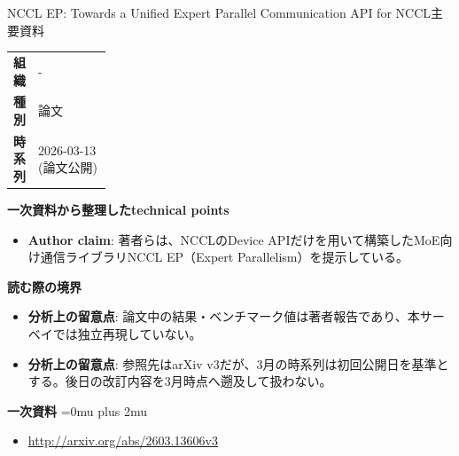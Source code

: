 \begin{technicalnote}{NCCL EP: Towards a Unified Expert Parallel Communication API for NCCL}{主要資料}
\begingroup
\begin{tabularx}{\linewidth}{@{}>{\bfseries}p{0.22\linewidth}X@{}}
組織 & - \\
種別 & 論文 \\
時系列 & 2026-03-13 (論文公開) \\
\end{tabularx}
\smallskip
{\bfseries 一次資料から整理したtechnical points}
\begin{itemize}[leftmargin=1.5em,itemsep=0.35em]
\item \textbf{Author claim}: 著者らは、NCCLのDevice APIだけを用いて構築したMoE向け通信ライブラリNCCL EP（Expert Parallelism）を提示している。
\end{itemize}
\begin{minipage}{\linewidth}
{\bfseries 読む際の境界}
\begin{itemize}[leftmargin=1.5em,itemsep=0.35em]
\item \textbf{分析上の留意点}: 論文中の結果・ベンチマーク値は著者報告であり、本サーベイでは独立再現していない。
\item \textbf{分析上の留意点}: 参照先はarXiv v3だが、3月の時系列は初回公開日を基準とする。後日の改訂内容を3月時点へ遡及して扱わない。
\end{itemize}
\begin{samepage}
{\bfseries 一次資料}
\begingroup\sloppy
\Urlmuskip=0mu plus 2mu\relax
\begin{itemize}[leftmargin=1.5em,itemsep=0.25em]
\item {\scriptsize\url{http://arxiv.org/abs/2603.13606v3}}
\end{itemize}
\endgroup
\end{samepage}
\end{minipage}
\endgroup
\end{technicalnote}
\medskip

